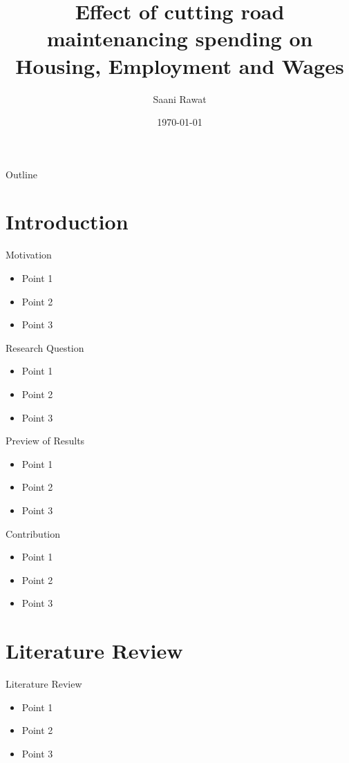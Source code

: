 \documentclass{beamer}
\title[Road maintenance Effects]{Effect of cutting road maintenancing spending on Housing, Employment and Wages}
\author{Saani Rawat}
\institute{University of Cincinnati}
\date{\today}
\begin{document}
\begin{frame}
    \titlepage
\end{frame}

\begin{frame}{Outline}
    \tableofcontents
\end{frame}

\section{Introduction}
\begin{frame}{Motivation}
    \begin{itemize}
        \item Point 1
        \item Point 2
        \item Point 3
    \end{itemize}
\end{frame}

\begin{frame}{Research Question}
    \begin{itemize}
        \item Point 1
        \item Point 2
        \item Point 3
    \end{itemize}
\end{frame}

\begin{frame}{Preview of Results}
    \begin{itemize}
        \item Point 1
        \item Point 2
        \item Point 3
    \end{itemize}
\end{frame}

\begin{frame}{Contribution}
    \begin{itemize}
        \item Point 1
        \item Point 2
        \item Point 3
    \end{itemize}
\end{frame}


\section{Literature Review}
\begin{frame}{Literature Review}
    \begin{itemize}
        \item Point 1
        \item Point 2
        \item Point 3
    \end{itemize}
\end{frame}
\end{document}
